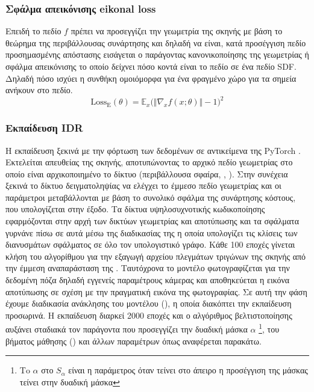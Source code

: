 \subsubsection{Σφάλμα απεικόνισης eikonal loss}
    Επειδή το πεδίο $f$ πρέπει να προσεγγίζει την γεωμετρία της  σκηνής με βάση το θεώρημα της περιβάλλουσας συνάρτησης και δηλαδή να είναι, κατά προσέγγιση πεδίο προσημασμένης απόστασης εισάγεται ο παράγοντας κανονικοποίησης της γεωμετρίας ή σφάλμα απεικόνισης το οποίο δείχνει πόσο κοντά είναι το πεδίο σε ένα πεδίο SDF. Δηλαδή πόσο ισχύει η συνθήκη ομοιόμορφα για ένα φραγμένο χώρο για τα σημεία ανήκουν στο πεδίο. 
    \begin{equation}
       {{\mathrm{Loss}_{\mathrm{E}}(\theta)=\mathbb{E}_{x}{\Big(}\Vert\nabla_{x}f(x;\theta)\Vert-1\Big)^{2}}}
    \end{equation}


\subsubsection{Εκπαίδευση IDR}
    H εκπαίδευση ξεκινά με την φόρτωση των δεδομένων σε αντικείμενα της PyTorch . Εκτελείται απευθείας  της σκηνής, αποτυπώνοντας το αρχικό πεδίο γεωμετρίας στο οποίο είναι αρχικοποιημένο το δίκτυο (περιβάλλουσα σφαίρα, ,  \cite{gropp2020implicit}). Στην συνέχεια ξεκινά το δίκτυο δειγματοληψίας να ελέγχει το έμμεσο πεδίο γεωμετρίας και οι παράμετροι μεταβάλλονται με βάση το συνολικό σφάλμα της συνάρτησης κόστους, που υπολογίζεται στην έξοδο. Τα δίκτυα υψηλοσυχνοτικής κωδικοποίησης εφαρμόζονται στην αρχή των δικτύων γεωμετρίας και αποτύπωσης και τα σφάλματα γυρνάνε πίσω σε αυτά μέσω της διαδικασίας της  η οποία υπολογίζει τις κλίσεις των διανυσμάτων σφάλματος σε όλο τον υπολογιστικό γράφο. Κάθε 100 εποχές γίνεται κλήση του  αλγορίθμου για την εξαγωγή αρχείου πλεγμάτων τριγώνων της  σκηνής από την έμμεση αναπαράσταση της . Ταυτόχρονα το μοντέλο φωτογραφίζεται για την δεδομένη πόζα δηλαδή εγγενείς παραμέτρους κάμερας και αποθηκεύεται η εικόνα αποτύπωσης σε σχέση με την πραγματική εικόνα της φωτογραφίας. Σε αυτή την φάση έχουμε διαδικασία ανάκλησης του μοντέλου (), η οποία διακόπτει την εκπαίδευση προσωρινά. Η εκπαίδευση διαρκεί 2000 εποχές και ο αλγόριθμος βελτιστοποίησης αυξάνει σταδιακά τον παράγοντα που προσεγγίζει την δυαδική μάσκα $\alpha$ \footnote{Τo $\alpha$ στο $S_\alpha$ είναι η παράμετρος όταν τείνει στο άπειρο η προσέγγιση της μάσκας τείνει στην δυαδική μάσκα}, του βήματος μάθησης () και άλλων παραμέτρων όπως αναφέρεται παρακάτω.

